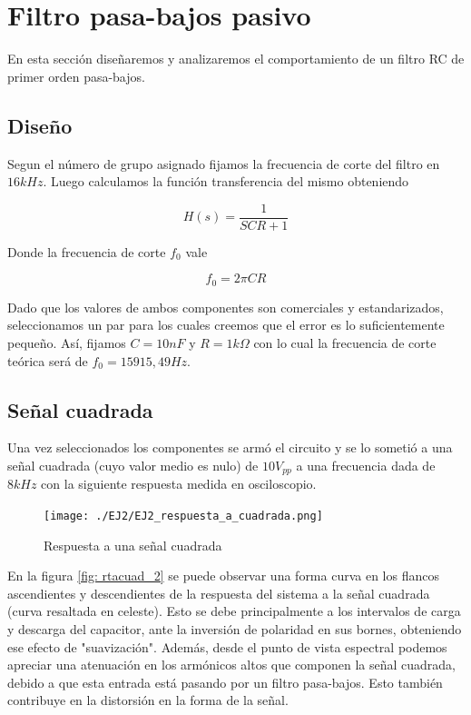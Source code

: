 
\section{Filtro pasa-bajos pasivo}

En esta secci\'on dise\~naremos y analizaremos el comportamiento de un filtro RC de primer orden pasa-bajos.

\subsection{Dise\~no}
Segun el n\'umero de grupo asignado fijamos la frecuencia de corte del filtro en $16kHz$. Luego calculamos la funci\'on transferencia del mismo obteniendo

\begin{equation}\label{ganancia_2}
H(s) = \frac{1}{SCR+1}
\end{equation}

Donde la frecuencia de corte $f_{0}$ vale

\begin{equation}\label{freccorte_2}
f_{0} = 2\pi CR
\end{equation}

Dado que los valores de ambos componentes son comerciales y estandarizados, seleccionamos un par para los cuales creemos que el error es lo suficientemente peque\~no. As\'i, fijamos $C=10nF$ y $R=1k\Omega$ con lo cual la frecuencia de corte te\'orica ser\'a de $f_{0}=15915,49Hz$.

\subsection{Se\~nal cuadrada}

Una vez seleccionados los componentes se arm\'o el circuito y se lo someti\'o a una se\~nal cuadrada (cuyo valor medio es nulo) de $10V_{pp}$ a una frecuencia dada de $8kHz$ con la siguiente respuesta medida en osciloscopio.

\begin{figure}[H]
    \centering
    \texttt{[image: ./EJ2/EJ2\_respuesta\_a\_cuadrada.png]}
    \caption{Respuesta a una se\~nal cuadrada}
    \label{fig:rtacuad_2} 
\end{figure}

En la figura \ref{fig: rtacuad_2} se puede observar una forma curva en los flancos ascendientes y descendientes de la respuesta del sistema a la se\~nal cuadrada (curva resaltada en celeste). Esto se debe principalmente a los intervalos de carga y descarga del capacitor, ante la inversi\'on de polaridad en sus bornes, obteniendo ese efecto de "suavizaci\'on". Adem\'as, desde el punto de vista espectral podemos apreciar una atenuaci\'on en los arm\'onicos altos que componen la se\~nal cuadrada, debido a que esta entrada est\'a pasando por un filtro pasa-bajos. Esto tambi\'en contribuye en la distorsi\'on en la forma de la se\~nal.

